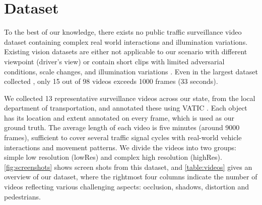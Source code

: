 \section{Dataset}
To the best of our knowledge, there exists no public traffic surveillance video dataset containing complex real world interactions and illumination variations. 
Existing vision datasets are either not applicable to our scenario with different viewpoint (driver's view) \cite{sivaraman2010general} 
or contain short clips with limited adversarial conditions, scale changes, and illumination variations \cite{manen2014appearances,wu2015object}. %
Even in the largest dataset collected \cite{wu2015object}, only 15 out of 98 videos exceeds 1000 frames (33 seconds).%

We collected 13 representative surveillance videos across our state, from the local department of transportation, and annotated these using VATIC \cite{springerlink:10.1007/s11263-012-0564-1}. Each object has its location and extent annotated on every frame, which is used as our ground truth. The average length of each video is five minutes (around 9000 frames), sufficient to cover several traffic signal cycles with real-world vehicle interactions and movement patterns. We divide the videos into two groups: simple low resolution (lowRes) and complex high resolution (highRes). \ref{fig:screenshots} shows screen shots from this dataset, and \ref{table:videos} gives an overview of our dataset, where the rightmost four columns indicate the number of videos reflecting various challenging aspects: occlusion, shadows, distortion and pedestrians.

